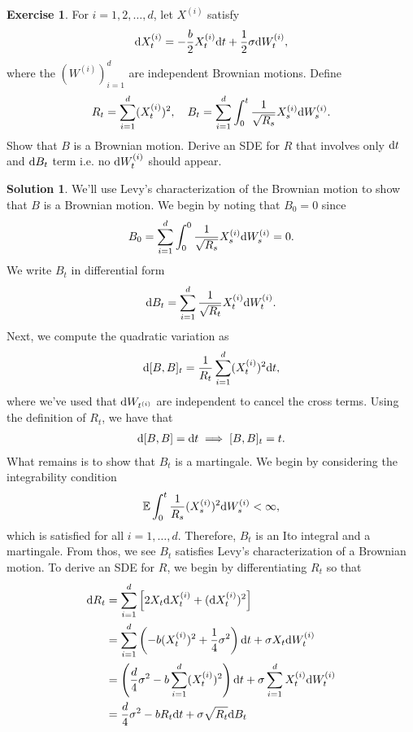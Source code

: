 \documentclass[12pt]{article}
\newcommand{\Expect}{\mathbb{E}}
\def\rd{{\rm d}}
\theoremstyle{definition}
\newtheorem{exer}{Exercise}
\newtheorem{sol}{Solution}
\theoremstyle{remark}
\def\d{{\rm d}}
\begin{document}
\begin{exer}
    For $i = 1, 2, \ldots, d$, let $X^{(i)}$ satisfy
    \begin{align*}
        \d X_{t}^{(i)} = - \frac{b}{2} X_{t}^{(i)} \d t + \frac{1}{2} \sigma \d W_{t}^{(i)},
    \end{align*}
    where the $(W^{(i)})_{i=1}^{d}$ are independent Brownian motions. Define
    \begin{equation*}
        R_{t} = \sum_{i=1}^{d} (X_{t}^{(i)})^{2}, \quad B_{t} = \sum_{i = 1}^{d} \int_{0}^{t} \frac{1}{\sqrt{R_{s}}} X_{s}^{(i)} \rd W_{s}^{(i)}.
    \end{equation*}
    Show that $B$ is a Brownian motion. Derive an SDE for $R$ that involves only  $\rd t$ and  $\rd B_{t}$ term i.e. no $\d W_{t}^{(i)}$ should appear.
\end{exer}

\begin{sol}
    We'll use Levy's characterization of the Brownian motion to show that $B$ is a Brownian motion. We begin by noting that $B_{0} = 0$ since 
\begin{align*}
    B_{0} = \sum_{i=1}^{d} \int_{0}^{0} \frac{1}{\sqrt{R_{s}}} X_{s}^{(i)} \d W_{s}^{(i)} = 0.
\end{align*}
We write $B_{t}$ in differential form
\begin{align*}
    \d B_{t} = \sum_{i=1}^{d} \frac{1}{\sqrt{R_{t}}} X_{t}^{(i)} \d W_{t}^{(i)}.
\end{align*} Next, we compute the quadratic variation as
\begin{align*}
   \d [B, B]_{t} = \frac{1}{R_{t}} \sum_{i=1}^{d} (X_{t}^{(i)})^{2} \d t,
\end{align*}
where we've used that $\d W_{t^{(i)}}$ are independent to cancel the cross terms. Using the definition of $R_{t}$, we have that
\begin{align*}
    \d [B,B] = \d t \implies [B, B]_{t} = t.
\end{align*}
What remains is to show that $B_{t}$ is a martingale. We begin by considering the integrability condition
\begin{align*}
    \Expect \int_{0}^{t} \frac{1}{R_{s}} (X_{s}^{(i)})^{2} \d W_{s}^{(i)} < \infty,
\end{align*}
which is satisfied for all $i = 1, \ldots, d$. Therefore, $B_{t}$ is an Ito integral and a martingale.  From thos, we see $B_{t}$ satisfies Levy's characterization of a Brownian motion.
To derive an SDE for $R$, we begin by differentiating $R_{t}$ so that
\begin{align*}
    \d R_{t} &= \sum_{i=1}^{d} \left[ 2 X_{t} \d X_{t}^{(i)} + (\d X_{t}^{(i)})^{2} \right]\\
             &= \sum_{i=1}^{d} \left(-b (X_{t}^{(i)})^{2} + \frac{1}{4}\sigma^2\right) \d t +\sigma  X_{t} \d W_{t}^{(i)}\\
             &=  \left( \frac{d}{4}\sigma^{2}  -b \sum_{i=1}^{d} (X_{t}^{(i)})^{2} \right) \d t +\sigma \sum_{i=1}^{d} X_{t}^{(i)}\d W_{t}^{(i)}\\
             &=  \frac{d}{4} \sigma^{2} - b R_{t} \d t + \sigma \sqrt{R_{t}} \d B_{t}
\end{align*}

\end{sol}
\end{document}
